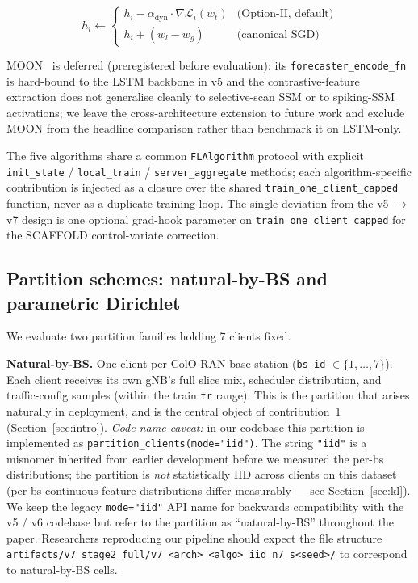 \documentclass[journal]{IEEEtran}
\newcommand{\alphadyn}{\ensuremath{\alpha_{\mathrm{dyn}}}}
\begin{document}
\begin{equation}\label{eq:feddyn}
  h_i \leftarrow
  \begin{cases}
    h_i - \alphadyn \cdot \nabla \mathcal{L}_i(w_t) & \text{(Option-II, default)} \\
    h_i + (w_l - w_g) & \text{(canonical SGD)}
  \end{cases}
\end{equation}

MOON~\cite{Li2021_MOON} is deferred (preregistered before evaluation): its \lstinline|forecaster_encode_fn| is hard-bound to the LSTM backbone in v5 and the contrastive-feature extraction does not generalise cleanly to selective-scan SSM or to spiking-SSM activations; we leave the cross-architecture extension to future work and exclude MOON from the headline comparison rather than benchmark it on LSTM-only.

The five algorithms share a common \lstinline|FLAlgorithm| protocol with explicit \lstinline|init_state| / \lstinline|local_train| / \lstinline|server_aggregate| methods; each algorithm-specific contribution is injected as a closure over the shared \lstinline|train_one_client_capped| function, never as a duplicate training loop. The single deviation from the v5 $\rightarrow$ v7 design is one optional grad-hook parameter on \lstinline|train_one_client_capped| for the SCAFFOLD control-variate correction.

\subsection{Partition schemes: natural-by-BS and parametric Dirichlet}\label{sec:partition}

We evaluate two partition families holding 7 clients fixed.

\textbf{Natural-by-BS.} One client per ColO-RAN base station (\lstinline|bs_id| $\in\{1, \ldots, 7\}$). Each client receives its own gNB's full slice mix, scheduler distribution, and traffic-config samples (within the train \lstinline|tr| range). This is the partition that arises naturally in deployment, and is the central object of contribution~1 (Section~\ref{sec:intro}). \emph{Code-name caveat:} in our codebase this partition is implemented as \lstinline|partition_clients(mode="iid")|. The string \lstinline|"iid"| is a misnomer inherited from earlier development before we measured the per-bs distributions; the partition is \emph{not} statistically IID across clients on this dataset (per-bs continuous-feature distributions differ measurably --- see Section~\ref{sec:kl}). We keep the legacy \lstinline|mode="iid"| API name for backwards compatibility with the v5 / v6 codebase but refer to the partition as ``natural-by-BS'' throughout the paper. Researchers reproducing our pipeline should expect the file structure \lstinline|artifacts/v7_stage2_full/v7_<arch>_<algo>_iid_n7_s<seed>/| to correspond to natural-by-BS cells.
\end{document}
